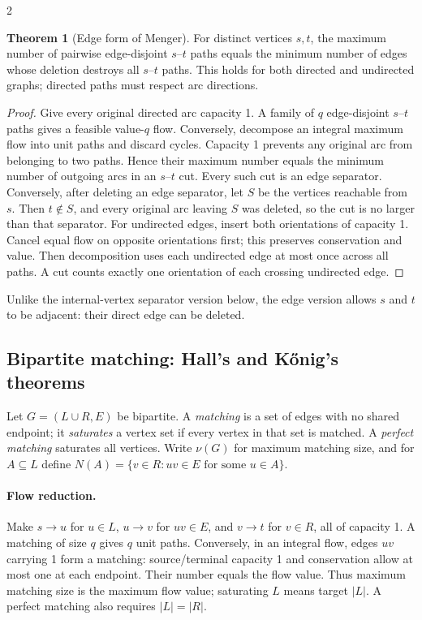 \documentclass[8pt]{extarticle}
\theoremstyle{definition}
\newtheorem{theorem}[definition]{Theorem}
\begin{document}
\begin{multicols*}{2}
\begin{theorem}[Edge form of Menger]\label{nf:edge-menger}
For distinct vertices $s,t$, the maximum number of pairwise edge-disjoint
$s$--$t$ paths equals the minimum number of edges whose deletion destroys
all $s$--$t$ paths. This holds for both directed and undirected graphs;
directed paths must respect arc directions.
\end{theorem}
\begin{proof}
Give every original directed arc capacity 1. A family of $q$ edge-disjoint
$s$--$t$ paths gives a feasible value-$q$ flow. Conversely, decompose an
integral maximum flow into unit paths and discard cycles. Capacity 1 prevents
any original arc from belonging to two paths. Hence their maximum number
equals the minimum number of outgoing arcs in an $s$--$t$ cut.
Every such cut is an edge separator. Conversely, after deleting an edge
separator, let $S$ be the vertices reachable from $s$. Then $t\notin S$,
and every original arc leaving $S$ was deleted, so the cut is no larger
than that separator.
For undirected edges, insert both orientations of capacity 1. Cancel equal
flow on opposite orientations first; this preserves conservation and value.
Then decomposition uses each undirected edge at most once across all paths.
A cut counts exactly one orientation of each crossing undirected edge.
\end{proof}
Unlike the internal-vertex separator version below, the edge version allows
$s$ and $t$ to be adjacent: their direct edge can be deleted.

\subsection{Bipartite matching: Hall's and K\H{o}nig's theorems}\label{nf:matching}
Let $G=(L\cup R,E)$ be bipartite. A \emph{matching} is a set of edges with
no shared endpoint; it \emph{saturates} a vertex set if every vertex in that
set is matched. A \emph{perfect matching} saturates all vertices.
Write $\nu(G)$ for maximum matching size, and for $A\subseteq L$ define
$N(A)=\{v\in R:uv\in E\text{ for some }u\in A\}$.

\paragraph{Flow reduction.}
Make $s\to u$ for $u\in L$, $u\to v$ for $uv\in E$, and $v\to t$ for
$v\in R$, all of capacity 1. A matching of size $q$ gives $q$ unit paths.
Conversely, in an integral flow, edges $uv$ carrying 1 form a matching:
source/terminal capacity 1 and conservation allow at most one at each
endpoint. Their number equals the flow value. Thus maximum matching size is
the maximum flow value; saturating $L$ means target $|L|$. A perfect
matching also requires $|L|=|R|$.


\end{multicols*}
\end{document}
